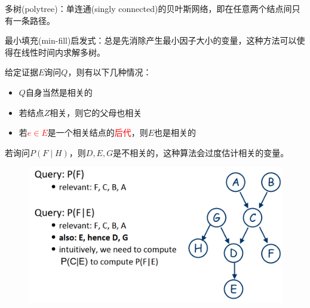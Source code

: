 多树(polytree)：单连通(singly connected)的贝叶斯网络，即在任意两个结点间只有一条路径。

最小填充(min-fill)启发式：总是先消除产生最小因子大小的变量，这种方法可以使得在线性时间内求解多树。

\begin{definition}
给定证据$E$询问$Q$，则有以下几种情况：
\begin{itemize}
	\item $Q$自身当然是相关的
	\item 若结点$Z$相关，则它的父母也相关
	\item 若\textcolor{red}{$e\in E$}是一个相关结点的\textcolor{red}{后代}，则$E$也是相关的
\end{itemize}
\end{definition}
\begin{example}
若询问$P(F\mid H)$，则$D,E,G$是不相关的，这种算法会过度估计相关的变量。
\begin{figure}[H]
\centering
\includegraphics[width=0.8\linewidth]{fig/relevance_example.png}
\end{figure}
\end{example}
